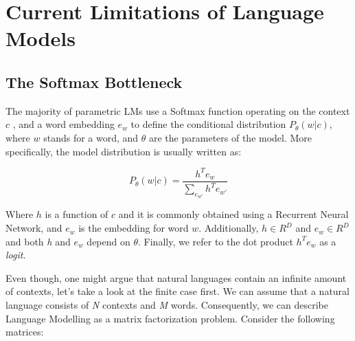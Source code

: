 \chapter{Current Limitations of Language Models}

\section{The Softmax Bottleneck}

The majority of parametric LMs use a Softmax function operating on the context $ c $ , and a word embedding $ e_w $ to define the conditional distribution $ P_\theta(w|c) $, where $ w $ stands for a word, and $ \theta $ are the parameters of the model. More specifically, the model distribution is usually written as:

\begin{displaymath}
    P_\theta(w | c) = \frac{h^Te_w}{\sum_{e_{w'}} h^Te_{w'}}
\end{displaymath}

Where $ h $ is a function of $ c $ and it is commonly obtained using a Recurrent Neural Network, and $ e_w $ is the embedding for word $ w $. Additionally, $ h \in R^D $ and $ e_w \in R^D $ and both \emph{h} and $ e_w $ depend on $ \theta $. Finally, we refer to the dot product $ h^Te_w $ as a \emph{logit}.

Even though, one might argue that natural languages contain an infinite amount of contexts, let's take a look at the finite case first. We can assume that a natural language consists of \emph{N} contexts and \emph{M} words. Consequently, we can describe Language Modelling as a matrix factorization problem. Consider the following matrices:

